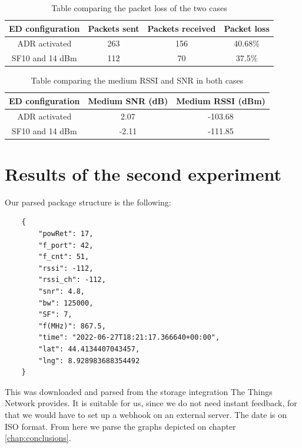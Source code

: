 \begin{table}[htpb]
    \centering
    \setlength{\arrayrulewidth}{0.5mm}
    \setlength{\tabcolsep}{18pt}
    \renewcommand{\arraystretch}{2}
    \begin{tabular}{|c|c|c|c|}
        \hline
         \cellcolor[HTML]{85C1E9}ED configuration & \cellcolor[HTML]{85C1E9}Packets sent & \cellcolor[HTML]{85C1E9}Packets received & \cellcolor[HTML]{85C1E9}Packet loss\\
         \hline
         ADR activated & 263 & 156 & 40.68\% \\
         SF10 and 14 dBm & 112 & 70 & 37.5\% \\
         \hline
    \end{tabular}
    \caption{Table comparing the packet loss of the two cases}
    \label{tab:packet_loss_exp1}
\end{table}

\begin{table}[htbp]
    \centering
    \setlength{\arrayrulewidth}{0.5mm}
    \setlength{\tabcolsep}{18pt}
    \renewcommand{\arraystretch}{2}
    \begin{tabular}{|c|c|c|}
        \hline
         \cellcolor[HTML]{85C1E9}ED configuration & \cellcolor[HTML]{85C1E9}Medium SNR (dB) & \cellcolor[HTML]{85C1E9}Medium RSSI (dBm)\\
         \hline
         ADR activated & 2.07 & -103.68 \\
         SF10 and 14 dBm & -2.11 & -111.85 \\
         \hline
    \end{tabular}
    \caption{Table comparing the medium RSSI and SNR in both cases}
    \label{tab:RSSI_SNR_exp1}
\end{table}


\section{Results of the second experiment}

Our parsed package structure is the following:

\begin{verbatim}
    {
        "powRet": 17,
        "f_port": 42,
        "f_cnt": 51,
        "rssi": -112,
        "rssi_ch": -112,
        "snr": 4.8,
        "bw": 125000,
        "SF": 7,
        "f(MHz)": 867.5,
        "time": "2022-06-27T18:21:17.366640+00:00",
        "lat": 44.4134407043457,
        "lng": 8.928983688354492
    }
\end{verbatim}
This was downloaded and parsed from the storage integration The Things Network provides.
It is suitable for us, since we do not need instant feedback, for that we would have to 
set up a webhook on an external server. The date is on ISO format. 
From here we parse the graphs depicted on chapter \ref{chap:conclusions}.

